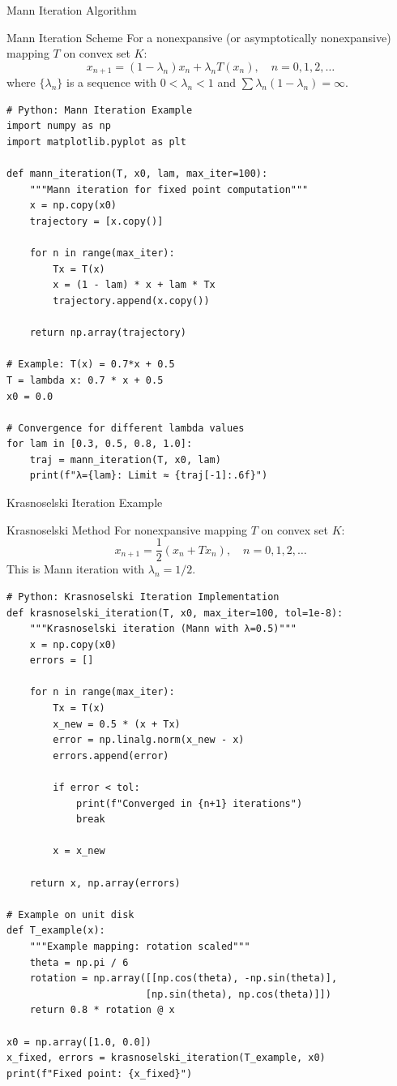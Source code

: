 \documentclass[aspectratio=169,10pt]{beamer}
\begin{document}
\begin{frame}[fragile]{Mann Iteration Algorithm}
    \begin{block}{Mann Iteration Scheme}
        For a nonexpansive (or asymptotically nonexpansive) mapping $T$ on convex set $K$:
        \[
        x_{n+1} = (1 - \lambda_n) x_n + \lambda_n T(x_n), \quad n = 0, 1, 2, \ldots
        \]
        where $\{\lambda_n\}$ is a sequence with $0 < \lambda_n < 1$ and $\sum \lambda_n(1-\lambda_n) = \infty$.
    \end{block}

    \begin{lstlisting}
# Python: Mann Iteration Example
import numpy as np
import matplotlib.pyplot as plt

def mann_iteration(T, x0, lam, max_iter=100):
    """Mann iteration for fixed point computation"""
    x = np.copy(x0)
    trajectory = [x.copy()]

    for n in range(max_iter):
        Tx = T(x)
        x = (1 - lam) * x + lam * Tx
        trajectory.append(x.copy())

    return np.array(trajectory)

# Example: T(x) = 0.7*x + 0.5
T = lambda x: 0.7 * x + 0.5
x0 = 0.0

# Convergence for different lambda values
for lam in [0.3, 0.5, 0.8, 1.0]:
    traj = mann_iteration(T, x0, lam)
    print(f"λ={lam}: Limit ≈ {traj[-1]:.6f}")
    \end{lstlisting}
\end{frame}

\begin{frame}[fragile]{Krasnoselski Iteration Example}
    \begin{block}{Krasnoselski Method}
        For nonexpansive mapping $T$ on convex set $K$:
        \[
        x_{n+1} = \frac{1}{2}(x_n + Tx_n), \quad n = 0, 1, 2, \ldots
        \]
        This is Mann iteration with $\lambda_n = 1/2$.
    \end{block}

    \begin{lstlisting}
# Python: Krasnoselski Iteration Implementation
def krasnoselski_iteration(T, x0, max_iter=100, tol=1e-8):
    """Krasnoselski iteration (Mann with λ=0.5)"""
    x = np.copy(x0)
    errors = []

    for n in range(max_iter):
        Tx = T(x)
        x_new = 0.5 * (x + Tx)
        error = np.linalg.norm(x_new - x)
        errors.append(error)

        if error < tol:
            print(f"Converged in {n+1} iterations")
            break

        x = x_new

    return x, np.array(errors)

# Example on unit disk
def T_example(x):
    """Example mapping: rotation scaled"""
    theta = np.pi / 6
    rotation = np.array([[np.cos(theta), -np.sin(theta)],
                        [np.sin(theta), np.cos(theta)]])
    return 0.8 * rotation @ x

x0 = np.array([1.0, 0.0])
x_fixed, errors = krasnoselski_iteration(T_example, x0)
print(f"Fixed point: {x_fixed}")
    \end{lstlisting}
\end{frame}
\end{document}
